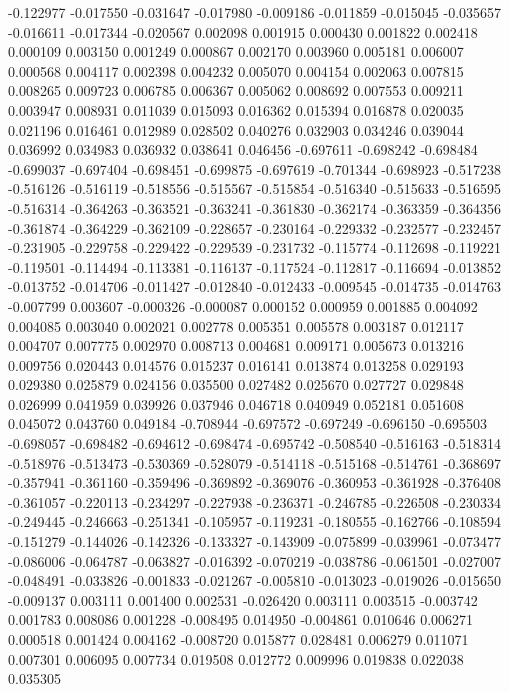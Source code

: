 -0.122977
-0.017550
-0.031647
-0.017980
-0.009186
-0.011859
-0.015045
-0.035657
-0.016611
-0.017344
-0.020567
0.002098
0.001915
0.000430
0.001822
0.002418
0.000109
0.003150
0.001249
0.000867
0.002170
0.003960
0.005181
0.006007
0.000568
0.004117
0.002398
0.004232
0.005070
0.004154
0.002063
0.007815
0.008265
0.009723
0.006785
0.006367
0.005062
0.008692
0.007553
0.009211
0.003947
0.008931
0.011039
0.015093
0.016362
0.015394
0.016878
0.020035
0.021196
0.016461
0.012989
0.028502
0.040276
0.032903
0.034246
0.039044
0.036992
0.034983
0.036932
0.038641
0.046456
-0.697611
-0.698242
-0.698484
-0.699037
-0.697404
-0.698451
-0.699875
-0.697619
-0.701344
-0.698923
-0.517238
-0.516126
-0.516119
-0.518556
-0.515567
-0.515854
-0.516340
-0.515633
-0.516595
-0.516314
-0.364263
-0.363521
-0.363241
-0.361830
-0.362174
-0.363359
-0.364356
-0.361874
-0.364229
-0.362109
-0.228657
-0.230164
-0.229332
-0.232577
-0.232457
-0.231905
-0.229758
-0.229422
-0.229539
-0.231732
-0.115774
-0.112698
-0.119221
-0.119501
-0.114494
-0.113381
-0.116137
-0.117524
-0.112817
-0.116694
-0.013852
-0.013752
-0.014706
-0.011427
-0.012840
-0.012433
-0.009545
-0.014735
-0.014763
-0.007799
0.003607
-0.000326
-0.000087
0.000152
0.000959
0.001885
0.004092
0.004085
0.003040
0.002021
0.002778
0.005351
0.005578
0.003187
0.012117
0.004707
0.007775
0.002970
0.008713
0.004681
0.009171
0.005673
0.013216
0.009756
0.020443
0.014576
0.015237
0.016141
0.013874
0.013258
0.029193
0.029380
0.025879
0.024156
0.035500
0.027482
0.025670
0.027727
0.029848
0.026999
0.041959
0.039926
0.037946
0.046718
0.040949
0.052181
0.051608
0.045072
0.043760
0.049184
-0.708944
-0.697572
-0.697249
-0.696150
-0.695503
-0.698057
-0.698482
-0.694612
-0.698474
-0.695742
-0.508540
-0.516163
-0.518314
-0.518976
-0.513473
-0.530369
-0.528079
-0.514118
-0.515168
-0.514761
-0.368697
-0.357941
-0.361160
-0.359496
-0.369892
-0.369076
-0.360953
-0.361928
-0.376408
-0.361057
-0.220113
-0.234297
-0.227938
-0.236371
-0.246785
-0.226508
-0.230334
-0.249445
-0.246663
-0.251341
-0.105957
-0.119231
-0.180555
-0.162766
-0.108594
-0.151279
-0.144026
-0.142326
-0.133327
-0.143909
-0.075899
-0.039961
-0.073477
-0.086006
-0.064787
-0.063827
-0.016392
-0.070219
-0.038786
-0.061501
-0.027007
-0.048491
-0.033826
-0.001833
-0.021267
-0.005810
-0.013023
-0.019026
-0.015650
-0.009137
0.003111
0.001400
0.002531
-0.026420
0.003111
0.003515
-0.003742
0.001783
0.008086
0.001228
-0.008495
0.014950
-0.004861
0.010646
0.006271
0.000518
0.001424
0.004162
-0.008720
0.015877
0.028481
0.006279
0.011071
0.007301
0.006095
0.007734
0.019508
0.012772
0.009996
0.019838
0.022038
0.035305
